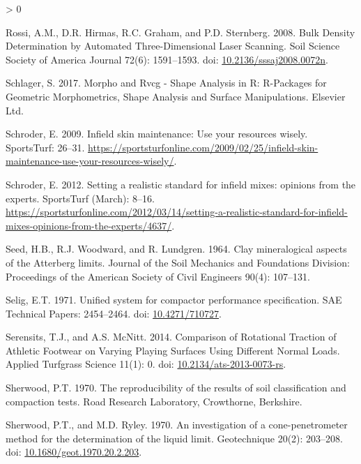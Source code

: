\documentclass[
  letterpaper,
  openany]{book}
\newlength{\cslhangindent}
\newenvironment{CSLReferences}[2] %
 {%
  \setlength{\parindent}{0pt}
  \ifodd #1 \everypar{\setlength{\hangindent}{\cslhangindent}}\ignorespaces\fi
  \ifnum #2 > 0
  \setlength{\parskip}{#2\baselineskip}
  \fi
 }%
 {}
\begin{document}
\begin{CSLReferences}{1}{0}
\leavevmode\hypertarget{ref-Rossi2008}{}%
Rossi, A.M., D.R. Hirmas, R.C. Graham, and P.D. Sternberg. 2008. {Bulk Density Determination by Automated Three-Dimensional Laser Scanning}. Soil Science Society of America Journal 72(6): 1591--1593. doi: \href{https://doi.org/10.2136/sssaj2008.0072n}{10.2136/sssaj2008.0072n}.

\leavevmode\hypertarget{ref-Schlager2017}{}%
Schlager, S. 2017. {Morpho and Rvcg - Shape Analysis in R: R-Packages for Geometric Morphometrics, Shape Analysis and Surface Manipulations}. Elsevier Ltd.

\leavevmode\hypertarget{ref-Schroder2009}{}%
Schroder, E. 2009. {Infield skin maintenance: Use your resources wisely}. SportsTurf: 26--31. \url{https://sportsturfonline.com/2009/02/25/infield-skin-maintenance-use-your-resources-wisely/}.

\leavevmode\hypertarget{ref-Schroder2012}{}%
Schroder, E. 2012. {Setting a realistic standard for infield mixes: opinions from the experts}. SportsTurf (March): 8--16. \url{https://sportsturfonline.com/2012/03/14/setting-a-realistic-standard-for-infield-mixes-opinions-from-the-experts/4637/}.

\leavevmode\hypertarget{ref-Seed1964a}{}%
Seed, H.B., R.J. Woodward, and R. Lundgren. 1964. {Clay mineralogical aspects of the Atterberg limits}. Journal of the Soil Mechanics and Foundations Division: Proceedings of the American Society of Civil Engineers 90(4): 107--131.

\leavevmode\hypertarget{ref-Selig1971}{}%
Selig, E.T. 1971. {Unified system for compactor performance specification}. SAE Technical Papers: 2454--2464. doi: \href{https://doi.org/10.4271/710727}{10.4271/710727}.

\leavevmode\hypertarget{ref-Serensits2014}{}%
Serensits, T.J., and A.S. McNitt. 2014. {Comparison of Rotational Traction of Athletic Footwear on Varying Playing Surfaces Using Different Normal Loads}. Applied Turfgrass Science 11(1): 0. doi: \href{https://doi.org/10.2134/ats-2013-0073-rs}{10.2134/ats-2013-0073-rs}.

\leavevmode\hypertarget{ref-Sherwood1970}{}%
Sherwood, P.T. 1970. {The reproducibility of the results of soil classification and compaction tests}. Road Research Laboratory, Crowthorne, Berkshire.

\leavevmode\hypertarget{ref-Sherwood1970a}{}%
Sherwood, P.T., and M.D. Ryley. 1970. {An investigation of a cone-penetrometer method for the determination of the liquid limit}. Geotechnique 20(2): 203--208. doi: \href{https://doi.org/10.1680/geot.1970.20.2.203}{10.1680/geot.1970.20.2.203}.


\end{CSLReferences}
\end{document}
